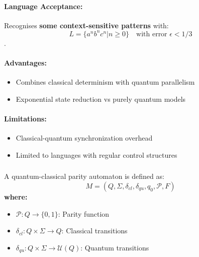 \paragraph{Language Acceptance:}
Recognises \textbf{some context-sensitive patterns} with:
\[ L = \{a^nb^nc^n | n \geq 0\} \quad \text{with error } \epsilon < 1/3 \]\cite{zheng2012two, gruska2005}.

\paragraph{Advantages:}
\begin{itemize}
    \item Combines classical determinism with quantum parallelism
    \item Exponential state reduction vs purely quantum models
\end{itemize}

\paragraph{Limitations:}
\begin{itemize}
    \item Classical-quantum synchronization overhead
    \item Limited to languages with regular control structures
\end{itemize}

\subsubsection{}
\label{subsec:qcpa}

\begin{definition}
A quantum-classical parity automaton is defined as:
\[
M = (Q, \Sigma, \delta_{cl}, \delta_{qu}, q_0, \mathcal{P}, F)
\]
\textbf{where:}
\begin{itemize}
    \item $\mathcal{P}: Q \rightarrow \{0,1\}$: Parity function
    \item $\delta_{cl}: Q \times \Sigma \rightarrow Q$: Classical transitions
    \item $\delta_{qu}: Q \times \Sigma \rightarrow \mathcal{U}(Q)$: Quantum transitions
\end{itemize}
\end{definition}


